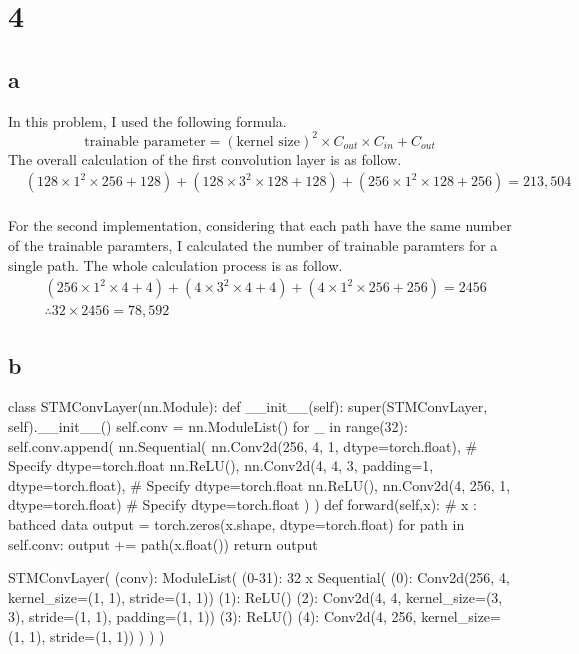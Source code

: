 \documentclass[10pt]{article}
\begin{document}
\section*{4}
\subsection*{a}
In this problem, I used the following formula.
\begin{equation*}
    \text{trainable parameter} = (\text{kernel size})^2 \times C_{out} \times C_{in} + C_{out}
\end{equation*}
The overall calculation of the first convolution layer is as follow.
\begin{align*}
    &(128\times 1^2 \times 256 + 128) + (128 \times 3^2 \times 128 + 128) + (256\times 1^2 \times 128 + 256) = 213,504 \\
\end{align*}

For the second implementation, considering that each path have the same number of the trainable paramters, I calculated the number of trainable paramters for a single path. 
The whole calculation process is as follow.
\begin{align*}
    &(256\times 1^2 \times 4 + 4) + (4 \times 3^2 \times 4 + 4) + (4\times 1^2 \times 256 + 256) = 2456 \\
    &\therefore 32\times 2456 = 78,592
\end{align*}
\subsection*{b}
\begin{python}
class STMConvLayer(nn.Module):
    def __init__(self):
        super(STMConvLayer, self).__init__()
        self.conv = nn.ModuleList()
        for _ in range(32):
            self.conv.append(
                nn.Sequential(
                    nn.Conv2d(256, 4, 1, dtype=torch.float),  # Specify dtype=torch.float
                    nn.ReLU(),
                    nn.Conv2d(4, 4, 3, padding=1, dtype=torch.float),  # Specify dtype=torch.float
                    nn.ReLU(),
                    nn.Conv2d(4, 256, 1, dtype=torch.float)  # Specify dtype=torch.float
                )
            )
    def forward(self,x): # x : bathced data
        output = torch.zeros(x.shape, dtype=torch.float)
        for path in self.conv:
            output += path(x.float())
        return output
\end{python}

\begin{python}
STMConvLayer(
  (conv): ModuleList(
    (0-31): 32 x Sequential(
      (0): Conv2d(256, 4, kernel_size=(1, 1), stride=(1, 1))
      (1): ReLU()
      (2): Conv2d(4, 4, kernel_size=(3, 3), stride=(1, 1), padding=(1, 1))
      (3): ReLU()
      (4): Conv2d(4, 256, kernel_size=(1, 1), stride=(1, 1))
    )
  )
)
\end{python}
\end{document}
